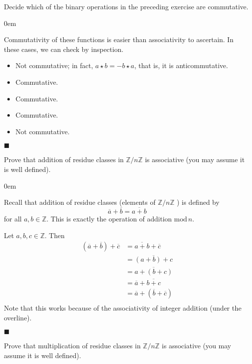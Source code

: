 \documentclass[12pt]{article}
\renewcommand{\qed}{\hfill$\blacksquare$}
\renewenvironment{proof}{\begin{addmargin}[1em]{0em}\begin{newproof}}{\end{newproof}\end{addmargin}\qed}
\newenvironment{problem}[2][Exercise]{\begin{trivlist}
\item[\hskip \labelsep {\bfseries #1}\hskip \labelsep {\bfseries #2.}]}{\end{trivlist}}
\begin{document}
\begin{problem}{1.1.2}
Decide which of the binary operations in the preceding exercise are commutative.
\end{problem}
\begin{proof}
Commutativity of these functions is easier than associativity to ascertain. In these cases, we can check by inspection.
\begin{itemize}
    \item Not commutative; in fact, $a\star b = - b\star a$, that is, it is anticommutative.
    \item Commutative.
    \item Commutative.
    \item Commutative.
    \item Not commutative.
\end{itemize}
\end{proof}



\begin{problem}{1.1.3}
Prove that addition of residue classes in $\mathbb{Z}/n\mathbb{Z}$ is associative (you may assume it is well defined).
\end{problem}

\begin{proof}
Recall that addition of residue classes (elements of  $\mathbb{Z}/n\mathbb{Z}$ ) is defined by
$$ \overline{a} + \overline{b} = \overline{a+b} $$ for all $a,b \in \mathbb{Z}$. This is exactly the operation of addition $\text{mod}\, n$.

Let $a,b,c\in \mathbb{Z}$. Then
\begin{equation*}
    \begin{split}
        \left(\overline{a}+\overline{b}\right)+\overline{c} & = \overline{a+b}+\overline{c} \\
        & = \overline{\left(a+b\right)+c} \\
        & = \overline{a + \left(b+c\right)} \\
        & = \overline{a} + \overline{b+c} \\
        & = \overline{a} + \left(\overline{b}+\overline{c}\right) \\
    \end{split}
\end{equation*}
Note that this works because of the associativity of integer addition (under the overline).
\end{proof}


\begin{problem}{1.1.4}
Prove that multiplication of residue classes in $\mathbb{Z}/n\mathbb{Z}$ is associative (you may assume it is well defined).
\end{problem}
\end{document}
